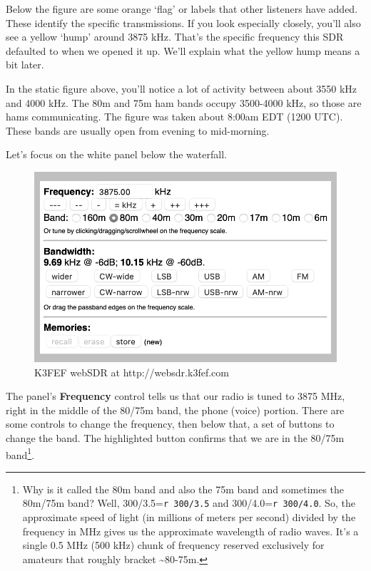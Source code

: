 \documentclass[
  letterpaper,
  DIV=11,
  numbers=noendperiod]{scrreport}
\begin{document}
Below the figure are some orange `flag' or labels that other listeners
have added. These identify the specific transmissions. If you look
especially closely, you'll also see a yellow `hump' around 3875 kHz.
That's the specific frequency this SDR defaulted to when we opened it
up. We'll explain what the yellow hump means a bit later.

In the static figure above, you'll notice a lot of activity between
about 3550 kHz and 4000 kHz. The 80m and 75m ham bands occupy 3500-4000
kHz, so those are hams communicating. The figure was taken about 8:00am
EDT (1200 UTC). These bands are usually open from evening to
mid-morning.

Let's focus on the white panel below the waterfall.

\begin{figure}

{\centering \includegraphics{include/img/k3fef-websdr-panel-1.png}

}

\caption{K3FEF webSDR at http://websdr.k3fef.com}

\end{figure}

The panel's \textbf{Frequency} control tells us that our radio is tuned
to 3875 MHz, right in the middle of the 80/75m band, the phone (voice)
portion. There are some controls to change the frequency, then below
that, a set of buttons to change the band. The highlighted button
confirms that we are in the 80/75m band\footnote{Why is it called the
  80m band and also the 75m band and sometimes the 80m/75m band? Well,
  300/3.5=\texttt{r\ 300/3.5} and 300/4.0=\texttt{r\ 300/4.0}. So, the
  approximate speed of light (in millions of meters per second) divided
  by the frequency in MHz gives us the approximate wavelength of radio
  waves. It's a single 0.5 MHz (500 kHz) chunk of frequency reserved
  exclusively for amateurs that roughly bracket \textasciitilde80-75m.}.
\end{document}

